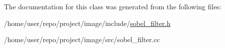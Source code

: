 The documentation for this class was generated from the following files\+:\begin{DoxyCompactItemize}
\item 
/home/user/repo/project/image/include/\hyperlink{sobel__filter_8h}{sobel\+\_\+filter.\+h}\item 
/home/user/repo/project/image/src/sobel\+\_\+filter.\+cc\end{DoxyCompactItemize}
